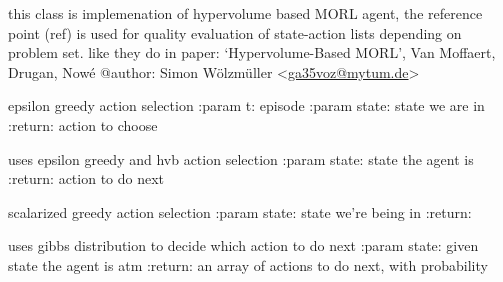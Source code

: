 \documentclass[letterpaper,10pt,english]{sphinxmanual}
\begin{document}
\begin{fulllineitems}
\label{Agents:morl_agents.MORLHVBAgent}
this class is implemenation of hypervolume based MORL agent,
the reference point (ref) is used for quality evaluation of
state-action lists depending on problem set.
like they do in paper: `Hypervolume-Based MORL', Van Moffaert, Drugan, Nowé
@author: Simon Wölzmüller \textless{}\href{mailto:ga35voz@mytum.de}{ga35voz@mytum.de}\textgreater{}

\begin{fulllineitems}
\label{Agents:morl_agents.MORLHVBAgent.decide}
epsilon greedy action selection
:param t: episode
:param state: state we are in
:return: action to choose

\end{fulllineitems}


\begin{fulllineitems}
\label{Agents:morl_agents.MORLHVBAgent.get_learned_action}
uses epsilon greedy and hvb action selection
:param state: state the agent is
:return: action to do next

\end{fulllineitems}


\begin{fulllineitems}
\label{Agents:morl_agents.MORLHVBAgent.get_learned_action_distribution}
scalarized greedy action selection
:param state: state we're being in
:return:

\end{fulllineitems}


\begin{fulllineitems}
\label{Agents:morl_agents.MORLHVBAgent.get_learned_action_gibbs_distribution}
uses gibbs distribution to decide which action to do next
:param state: given state the agent is atm
:return: an array of actions to do next, with probability


\end{fulllineitems}
\end{fulllineitems}
\end{document}
